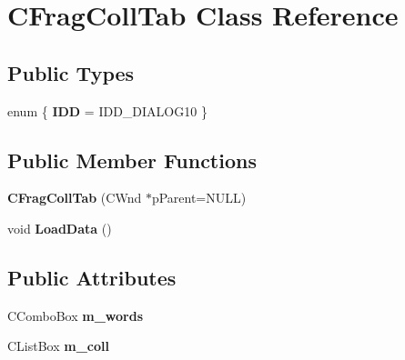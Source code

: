 \hypertarget{class_c_frag_coll_tab}{\section{C\-Frag\-Coll\-Tab Class Reference}
\label{class_c_frag_coll_tab}
}
\subsection*{Public Types}
\begin{DoxyCompactItemize}
\item 
enum \{ {\bfseries I\-D\-D} =  I\-D\-D\-\_\-\-D\-I\-A\-L\-O\-G10
 \}
\end{DoxyCompactItemize}
\subsection*{Public Member Functions}
\begin{DoxyCompactItemize}
\item 
\hypertarget{class_c_frag_coll_tab_a46939d4161569eb57fb6625f1e5bc510}{{\bfseries C\-Frag\-Coll\-Tab} (C\-Wnd $\ast$p\-Parent=N\-U\-L\-L)}\label{class_c_frag_coll_tab_a46939d4161569eb57fb6625f1e5bc510}

\item 
\hypertarget{class_c_frag_coll_tab_ac475722eb8aa2db79602d08f6a059c49}{void {\bfseries Load\-Data} ()}\label{class_c_frag_coll_tab_ac475722eb8aa2db79602d08f6a059c49}

\end{DoxyCompactItemize}
\subsection*{Public Attributes}
\begin{DoxyCompactItemize}
\item 
\hypertarget{class_c_frag_coll_tab_a71862e6baac267d71fc4de1e235b5543}{C\-Combo\-Box {\bfseries m\-\_\-words}}\label{class_c_frag_coll_tab_a71862e6baac267d71fc4de1e235b5543}

\item 
\hypertarget{class_c_frag_coll_tab_a3ba19d81f1b4b8872b6d505fe7dfb4b8}{C\-List\-Box {\bfseries m\-\_\-coll}}\label{class_c_frag_coll_tab_a3ba19d81f1b4b8872b6d505fe7dfb4b8}

\end{DoxyCompactItemize}
